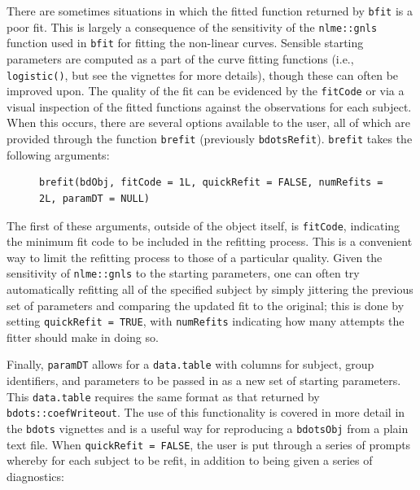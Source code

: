 \documentclass{article}
\newcommand{\xt}{\texttt}%
\begin{document}
There are sometimes situations in which the fitted function returned by \texttt{bfit} is a poor fit. This is largely a consequence of the sensitivity of the \xt{nlme::gnls} function used in \xt{bfit} for fitting the non-linear curves. Sensible starting parameters are computed as a part of the curve fitting functions (i.e., \xt{logistic()}, but see the vignettes for more details), though these can often be improved upon. The quality of the fit can be evidenced by the \texttt{fitCode} or via a visual inspection of the fitted functions against the observations for each subject.  When this occurs, there are several options available to the user, all of which are provided through the function \texttt{brefit} (previously \texttt{bdotsRefit}). \texttt{brefit} takes the following arguments:



\begin{singlespace}
\begin{figure}[H]
\centering
\begin{BVerbatim}
brefit(bdObj, fitCode = 1L, quickRefit = FALSE, numRefits = 2L, paramDT = NULL)
\end{BVerbatim}
\end{figure}
\end{singlespace}

The first of these arguments, outside of the object itself, is \texttt{fitCode}, indicating  the minimum fit code to be included in the refitting process. This is a convenient way to limit the refitting process to those of a particular quality. Given the sensitivity of \xt{nlme::gnls} to the starting parameters, one can often try automatically refitting all of the specified subject by simply jittering the previous set of parameters and comparing the updated fit to the original; this is done by setting \xt{quickRefit = TRUE}, with \xt{numRefits} indicating how many attempts the fitter should make in doing so.


Finally, \texttt{paramDT} allows for a \texttt{data.table} with columns for subject, group identifiers, and parameters to be passed in as a new set of starting parameters. This \texttt{data.table} requires the same format as that returned by \texttt{bdots::coefWriteout}. The use of this functionality is covered in more detail in the \xt{bdots} vignettes and is a useful way for reproducing a \xt{bdotsObj} from a plain text file. When \texttt{quickRefit = FALSE}, the user is put through a series of prompts whereby for each subject to be refit, in addition to being given a series of diagnostics:
\end{document}
